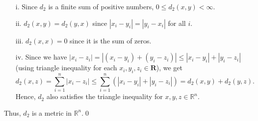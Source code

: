 \begin{solution}
    \begin{enumerate}
        \item[i.]
          Since $d_2$ is a finite sum of positive numbers,
          $0\leq d_2(x,y)<\infty$.
        \item[ii.]
          $d_2(x,y)=d_2(y,x)$ since $|x_i-y_i|=|y_i-x_i|$
          for all $i$.
        \item[iii.]
          $d_2(x,x)=0$ since it is the sum of zeros.
        \item[iv.]
          Since we have $|x_i-z_i|=|(x_i-y_i)+(y_i-z_i)|
          \leq |x_i-y_i|+|y_i-z_i|$ (using triangle inequality
          for each $x_i, y_i, z_i \in \mathbf{R}$), we get
          $$d_2(x,z)=\sum_{i=1}^n |x_i - z_i|\leq
          \sum_{i=1}^n{\left(|x_i - y_i|+|y_i-z_i|\right)}
          =d_2(x,y)+d_2(y,z).$$
          Hence, $d_2$ also satisfies the triangle inequality
          for $x,y,z\in \mathbb{R}^n$.   
      \end{enumerate}
      Thus, $d_2$ is a metric in $\mathbb{R}^n$.\qed
\end{solution}